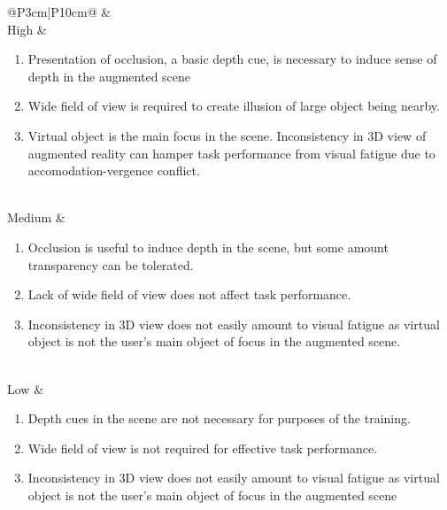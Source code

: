 \begin{table}
	\centering
	\caption{Levels of photorealism}
	\label{tab:trainingoptions}
	\begin{tabular}{@{}P{3cm}|P{10cm}@{}}
		\toprule
		 &  \\ 
		\hline
		High & \vspace{-2mm} \begin{enumerate}[leftmargin=*,topsep=0pt,align=left,itemsep=0.25pt,after=]
			\item Presentation of occlusion, a basic depth cue, is necessary to induce sense of depth in the augmented scene
			\item Wide field of view is required to create illusion of large object being nearby.	
			\item  Virtual object is the main focus in the scene. Inconsistency in 3D view of augmented reality can hamper task performance from visual fatigue due to accomodation-vergence conflict.
		\end{enumerate}\\
		\hline
		Medium & \vspace{-2mm} \begin{enumerate}[leftmargin=*,topsep=0pt,align=left,itemsep=0.25pt,after=]
			\item Occlusion is useful to induce depth in the scene, but some amount transparency can be tolerated.
			\item  Lack of wide field of view does not affect task performance. 
			\item  Inconsistency in 3D view does not easily amount to visual fatigue as virtual object is not the user's main object of focus in the augmented scene.
		\end{enumerate}\\
		\hline
		Low & \vspace{-2mm} \begin{enumerate}[leftmargin=*,topsep=0pt,align=left,itemsep=0.25pt,after=]
			\item Depth cues in the scene are not necessary for purposes of the training.
			\item Wide field of view is not required for effective task performance.
			\item Inconsistency in 3D view does not easily amount to visual fatigue as virtual object is not the user's main object of focus in the augmented scene
		\end{enumerate}\\
		\bottomrule
	\end{tabular}
\end{table}


